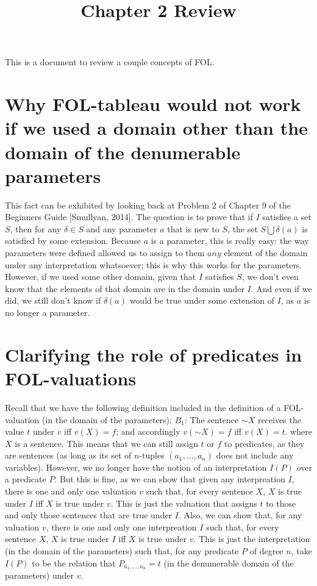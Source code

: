 \documentclass{article}
\title{Chapter 2 Review}
\newcommand*{\oldneg}{\mathord{\sim}}
\theoremstyle{definition}
\begin{document}
\maketitle


This is a document to review a couple concepts of FOL. 

\section*{Why FOL-tableau would not work if we used a domain other than the domain of the denumerable parameters}


This fact can be exhibited by looking back at Problem 2 of Chapter 9 of the Beginners Guide [Smullyan, 2014]. The question is to prove that if $I$ 
satisfies a set $S$, then for any $\delta\in S$ and any parameter $a$ that is new to $S$, the set $S\bigcup{\delta(a)}$ is satisfied by some extension. 
Because $a$ is a parameter, this is really easy: the way parameters were defined allowed us to assign to them $any$ element of the domain under any 
interpretation whatsoever; this is why this works for the parameters. However, if we used some other domain, given that $I$ satisfies $S$, we don't 
even know that the elements of that domain are in the domain under $I$. And even if we did, we still don't know if $\delta(a)$ would be true under some 
extension of $I$, as $a$ is no longer a parameter.   

\section*{Clarifying the role of predicates in FOL-valuations}


Recall that we have the following definition included in the definition of a FOL-valuation (in the domain of the parameters):\newline
$B_1$: The sentence $\oldneg X$ receives the value $t$ under $v$ iff $v(X)=f$; and accordingly $v(\oldneg X)=f$ iff $v(X)=t$.\newline
where $X$ is a sentence. This means that we can still assign $t$ or $f$ to predicates, as they are sentences (as long as its set of 
$n$-tuples $(a_1,...,a_n)$ does not include any variables). However, we no longer have the notion of an interpretation $I(P)$ over a predicate $P$. But 
this is fine, as we can show that given any interpreation $I$, there is one and only one valuation $v$ such that, for every sentence $X$, $X$ is true 
under $I$ iff $X$ is true under $v$. This is just the valuation that assigns $t$ to those and only those sentences that are true under $I$. Also, we can 
show that, for any valuation $v$, there is one and only one interpreation $I$ such that, for every sentence $X$, $X$ is true under $I$ iff $X$ is 
true under $v$. This is just the interpretation (in the domain of the parameters)
such that, for any predicate $P$ of degree $n$, take $I(P)$ to be the relation that $P_{a_1,...,a_n}=t$ (in the denumerable domain of the parameters) 
under $v$.
\end{document}
